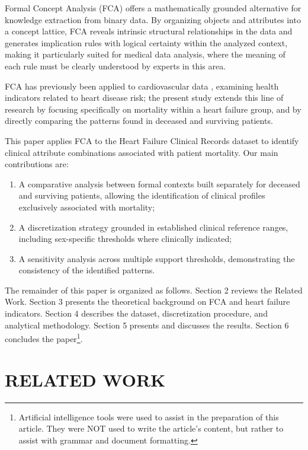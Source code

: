 \documentclass[a4paper,twoside]{article}
\begin{document}
Formal Concept Analysis (FCA) \cite{GanterWille1999,Ananias2021} offers a mathematically grounded alternative for knowledge extraction from binary data. By organizing objects and attributes into a concept lattice, FCA reveals intrinsic structural relationships in the data and generates implication rules with logical certainty within the analyzed context, making it particularly suited for medical data analysis, where the meaning of each rule must be clearly understood by experts in this area.

FCA has previously been applied to cardiovascular data \cite{Xavier2025}, examining health indicators related to heart disease risk; the present study extends this line of research by focusing specifically on mortality within a heart failure group, and by directly comparing the patterns found in deceased and surviving patients.

This paper applies FCA to the Heart Failure Clinical Records dataset \cite{Ahmad2017,ChiccoJurman2020} to identify clinical attribute combinations associated with patient mortality. Our main contributions are:

\begin{enumerate}
    \item A comparative analysis between formal contexts built separately for deceased and surviving patients, allowing the identification of clinical profiles exclusively associated with mortality;
    \item A discretization strategy grounded in established clinical reference ranges, including sex-specific thresholds where clinically indicated;
    \item A sensitivity analysis across multiple support thresholds, demonstrating the consistency of the identified patterns.
\end{enumerate}

The remainder of this paper is organized as follows. Section 2 reviews the Related Work. Section 3 presents the theoretical background on FCA and heart failure indicators. Section 4 describes the dataset, discretization procedure, and analytical methodology. Section 5 presents and discusses the results. Section 6 concludes the paper\footnote{Artificial intelligence tools were used to assist in the preparation of this article. They were NOT used to write the article's content, but rather to assist with grammar and document formatting.}.

\section{\uppercase{Related Work}}
\label{sec:related_work}
\end{document}
